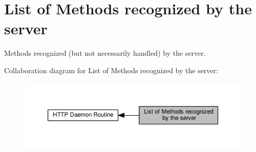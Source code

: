 \hypertarget{group__Methods}{}\section{List of Methods recognized by the server}
\label{group__Methods}


Methods recognized (but not necessarily handled) by the server.  


Collaboration diagram for List of Methods recognized by the server\+:
\nopagebreak
\begin{figure}[H]
\begin{center}
\leavevmode
\includegraphics[width=350pt]{group__Methods}
\end{center}
\end{figure}
